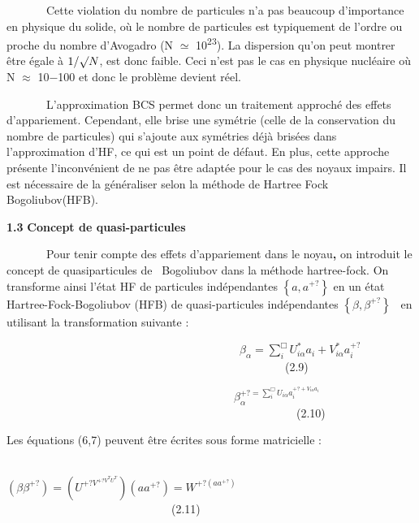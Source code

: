 \documentclass[a4paper]{article}
\begin{document}
\ \ \ \ \ \ \ Cette violation du nombre de particules n’a pas beaucoup d’importance en physique du solide, où le nombre
de particules est typiquement de l’ordre ou proche du nombre d’Avogadro (N ${\simeq}$ 10\textsuperscript{23}). La
dispersion qu’on peut montrer être égale à $1/{\surd}N$, est donc faible. Ceci n’est pas le cas en physique nucléaire
où N ${\approx}$ 10$-$100 et donc le problème devient réel.

\ \ \ \ \ \ \ L’approximation BCS permet donc un traitement approché des effets d’appariement. Cependant, elle brise une
symétrie (celle de la conservation du nombre de particules) qui s’ajoute aux symétries déjà brisées dans
l’approximation d’HF, ce qui est un point de défaut. En plus, cette approche présente l’inconvénient de ne pas être
adaptée pour le cas des noyaux impairs. Il est nécessaire de la généraliser selon la méthode de Hartree Fock
Bogoliubov(HFB).

\textbf{1.3} \textbf{Concept de quasi-particules}

\ \ \ \ \ \ \ Pour tenir compte des effets d’appariement dans le noyau\textbf{,} on introduit le concept de
quasiparticules de \ Bogoliubov dans la méthode hartree-fock. On transforme ainsi l’état HF de particules indépendantes
 $\left\{a,a^{+?}\right\}$ en un état Hartree-Fock-Bogoliubov (HFB) de quasi-particules indépendantes  $\left\{\beta
,\beta ^{+?}\right\}$ \ en utilisant la transformation suivante :


\bigskip

\ \ \ \ \ \ \ \ \ \ \ \ \ \ \ \ \ \ \ \ \ \ \ \ \ \ \ \ \ \ \ \ \ \ \ \ \ \ \ \ \  $\beta _{\alpha }=\sum _i^{\Box
}U_{\mathit{i\alpha }}^{\ast }a_i+V_{\mathit{i\alpha }}^{\ast
}a_i^{+?}$\ \ \ \ \ \ \ \ \ \ \ \ \ \ \ \ \ \ \ \ \ \ \ \ \ \ \ \ \ \ \ \ \ \ \ \ \ \ \ \ \ \ \ \ \ \ \ \ \ (2.9)


\bigskip

\ \ \ \ \ \ \ \ \ \ \ \ \ \ \ \ \ \ \ \ \ \ \ \ \ \ \ \ \ \ \ \ \ \ \ \ \ \ \ \  $\beta _{\alpha }^{+?=\sum _i^{\Box
}U_{\mathit{i\alpha }}a_i^{+?+V_{\mathit{i\alpha
}}a_i}}$\ \ \ \ \ \ \ \ \ \ \ \ \ \ \ \ \ \ \ \ \ \ \ \ \ \ \ \ \ \ \ \ \ \ \ \ \ \ \ \ \ \ \ \ \ \ \ \ \ \ \ (2.10)


\bigskip


\bigskip

Les équations (6,7) peuvent être écrites sous forme matricielle :


\bigskip


\bigskip

\ \ \ \ \ \ \ \ \ \ \ \ \ \ \ \ \ \ \ \ \ \ \ \ \ \ \ \ \ \ \ \ \ \ \ \  $\left(\beta \beta
^{+?}\right)=\left(U^{+?V^{+?V^TU^T}}\right)\left(aa^{+?}\right)=W^{+?\left(aa^{+?}\right)}$\ \ \ \ \ \ \ \ \ \ \ \ \ \ \ \ \ \ \ \ \ \ \ \ \ \ \ \ \ (2.11)
\end{document}
